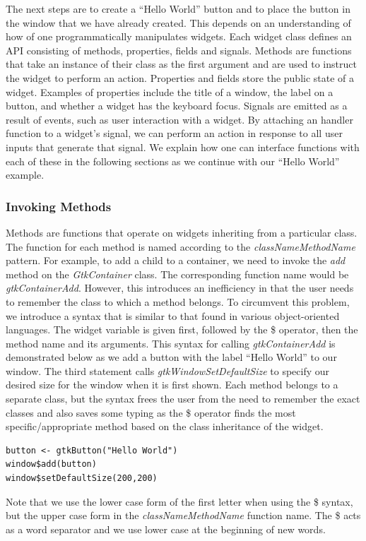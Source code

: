 \documentclass[article]{jss}
\begin{document}
The next steps are to create a ``Hello World'' button and to place the
button in the window that we have already created. This depends on an
understanding of how of one programmatically manipulates widgets.
Each widget class defines an API consisting of methods, properties,
fields and signals. Methods are functions that take an instance of
their class as the first argument and are used to instruct the widget
to perform an action. Properties and fields store the public state of
a widget. Examples of properties include the title of a window, the
label on a button, and whether a widget has the keyboard focus.
Signals are emitted as a result of events, such as user interaction
with a widget.
By attaching an  handler function to a widget's signal, we
can
perform an action in response to all user inputs that generate that
signal. We explain how one can interface  functions with
each of these in the following sections as we continue with our
``Hello World'' example.

\subsubsection{Invoking Methods}

Methods are functions that operate on widgets inheriting from a
particular class.  The  function for each  method
is named according to the \emph{classNameMethodName} pattern. For
example, to add a child to a container, we need to invoke the
\emph{add} method on the \emph{GtkContainer} class.  The corresponding
function name would be \emph{gtkContainerAdd}.  However, this
introduces an inefficiency in that the user needs to remember the
class to which a method belongs. To circumvent this problem, we
introduce a syntax that is similar to that found in various
object-oriented languages. The widget variable is given first,
followed by the \$ operator, then the method name and its
arguments. This syntax for calling \emph{gtkContainerAdd} is
demonstrated below as we add a button with the label ``Hello World''
to our window.  The third statement calls
\emph{gtkWindowSetDefaultSize} to specify our desired size for the
window when it is first shown. Each method belongs to a separate
class, but the syntax frees the user from the need to remember the
exact classes and also saves some typing as 
the \$ operator finds the most specific/appropriate method based on
the class inheritance of the widget.
\begin{verbatim}
button <- gtkButton("Hello World")
window$add(button)
window$setDefaultSize(200,200)
\end{verbatim}
Note that we use the lower case form of the first letter when using
the \$ syntax, but the upper case form in the
\emph{classNameMethodName} function name. The \$ acts as a word
separator and we use lower case at the beginning of new words.
\end{document}
